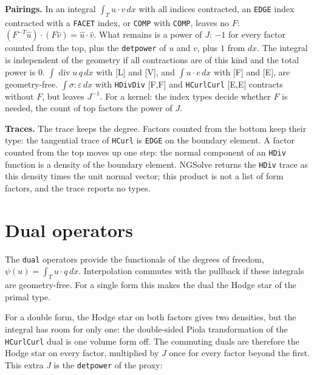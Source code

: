 \documentclass[10pt,a4paper]{article}
\newcommand{\code}[1]{\texttt{#1}}
\newcommand{\VV}{\textsf{V}}
\newcommand{\EE}{\textsf{E}}
\newcommand{\FF}{\textsf{F}}
\newcommand{\LL}{\textsf{L}}
\begin{document}
\textbf{Pairings.} In an integral $\int_T u \cdot v\,dx$ with all indices contracted, an \code{EDGE} index contracted with a \code{FACET} index, or \code{COMP} with \code{COMP}, leaves no $F$: $(F^{-T}\hat u)\cdot(F\hat v) = \hat u\cdot\hat v$. What remains is a power of $J$: $-1$ for every factor counted from the top, plus the \code{detpower} of $u$ and $v$, plus $1$ from $dx$. The integral is independent of the geometry if all contractions are of this kind and the total power is $0$. $\int \operatorname{div} u\,q\,dx$ with [\LL] and [\VV], and $\int u\cdot e\,dx$ with [\FF] and [\EE], are geometry-free. $\int \sigma : \varepsilon\,dx$ with \code{HDivDiv} [\FF,\FF] and \code{HCurlCurl} [\EE,\EE] contracts without $F$, but leaves $J^{-1}$. For a kernel: the index types decide whether $F$ is needed, the count of top factors the power of $J$.

\textbf{Traces.} The trace keeps the degree. Factors counted from the bottom keep their type: the tangential trace of \code{HCurl} is \code{EDGE} on the boundary element. A factor counted from the top moves up one step: the normal component of an \code{HDiv} function is a density of the boundary element. NGSolve returns the \code{HDiv} trace as this density times the unit normal vector; this product is not a list of form factors, and the trace reports no types.

\section{Dual operators}\label{sec:dual}

The \code{dual} operators provide the functionals of the degrees of freedom, $\psi(u) = \int_T u \cdot q\,dx$. Interpolation commutes with the pullback if these integrals are geometry-free. For a single form this makes the dual the Hodge star of the primal type.

For a double form, the Hodge star on both factors gives two densities, but the integral has room for only one: the double-sided Piola transformation of the \code{HCurlCurl} dual is one volume form off. The commuting duals are therefore the Hodge star on every factor, multiplied by $J$ once for every factor beyond the first. This extra $J$ is the \code{detpower} of the proxy:
\end{document}
